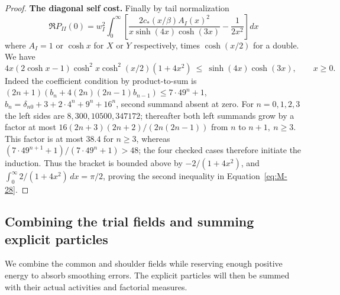 \begin{proof}
\par\smallskip\noindent\textbf{The diagonal self cost.}
Finally by tail normalization
\[
 \Re P_{II}(0)=w_I^2\int_0^\infty
 \left[\frac{2 c_*(x/\beta) A_I(x)^2}{x\sinh(4x)\cosh(3x)}-\frac1{2x^2}\right]dx
\]
where \(A_I=1\) or \(\cosh x\) for \(X\) or \(Y\) respectively, times \(\cosh(x/2)\) for a double. We have
\[
 4x(2\cosh x-1)\cosh^2 x\cosh^2(x/2)(1+4x^2)
 \ \le\ \sinh(4x)\cosh(3x),\qquad x\ge0.
\]
Indeed the coefficient condition by product-to-sum is
\((2n+1)(b_n+4(2n)(2n-1)b_{n-1})\le7\cdot49^n+1\),
\(b_n=\delta_{n0}+3+2\cdot4^n+9^n+16^n\), second summand absent at zero. For \(n=0,1,2,3\) the left sides are \(8,300,10500,347172\); thereafter both left summands grow by a factor at most \(16(2n+3)(2n+2)/(2n(2n-1))\) from \(n\) to \(n+1,\ n\ge3\). This factor is at most \(38.4\) for \(n\ge3\), whereas \((7\cdot49^{n+1}+1)/(7\cdot49^n+1)>48\); the four checked cases therefore initiate the induction. Thus the bracket is bounded above by \(-2/(1+4x^2)\), and \(\int_0^\infty 2/(1+4x^2)\,dx=\pi/2\), proving the second inequality in Equation~\eqref{eq:M-28}.


\end{proof}

\subsection{Combining the trial fields and summing explicit particles}

We combine the common and shoulder fields while reserving enough positive
energy to absorb smoothing errors. The explicit particles will then be
summed with their actual activities and factorial measures.

